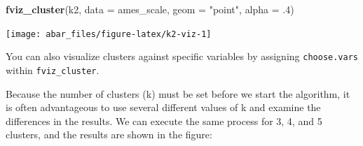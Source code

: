 \documentclass[]{book}
\newenvironment{Shaded}{\begin{snugshade}}{\end{snugshade}}
\newcommand{\DataTypeTok}[1]{\textcolor[rgb]{0.13,0.29,0.53}{#1}}
\newcommand{\FloatTok}[1]{\textcolor[rgb]{0.00,0.00,0.81}{#1}}
\newcommand{\KeywordTok}[1]{\textcolor[rgb]{0.13,0.29,0.53}{\textbf{#1}}}
\newcommand{\NormalTok}[1]{#1}
\newcommand{\StringTok}[1]{\textcolor[rgb]{0.31,0.60,0.02}{#1}}
\theoremstyle{definition}
\theoremstyle{definition}
\theoremstyle{definition}
\theoremstyle{remark}
\let\BeginKnitrBlock\begin \let\EndKnitrBlock\end
\begin{document}
\begin{Shaded}
\begin{Highlighting}[]
\KeywordTok{fviz_cluster}\NormalTok{(k2, }\DataTypeTok{data =}\NormalTok{ ames_scale, }\DataTypeTok{geom =} \StringTok{"point"}\NormalTok{, }\DataTypeTok{alpha =} \FloatTok{.4}\NormalTok{)}
\end{Highlighting}
\end{Shaded}

\begin{center}\texttt{[image: abar\_files/figure-latex/k2-viz-1]} \end{center}

\BeginKnitrBlock{tip}
You can also visualize clusters against specific variables by assigning
\texttt{choose.vars} within \texttt{fviz\_cluster}.
\EndKnitrBlock{tip}

Because the number of clusters (k) must be set before we start the
algorithm, it is often advantageous to use several different values of k
and examine the differences in the results. We can execute the same
process for 3, 4, and 5 clusters, and the results are shown in the
figure:
\end{document}
